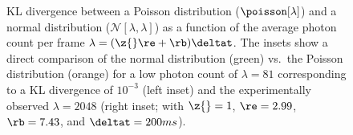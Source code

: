 \begin{figure}[t]
  \begin{panel}{}{\textwidth}
    \small
    \centerline{}
  \end{panel}
  \caption{%
    KL divergence between a Poisson distribution ($\poisson[\lambda]$) and a
    normal distribution ($\mathcal{N}[\lambda,\lambda]$) as a function of the
    average photon count per frame $\lambda = (\z{}\re + \rb)\deltat$. The
    insets show a direct comparison of the normal distribution (green) vs.\ the
    Poisson distribution (orange) for a low photon count of $\lambda=81$
    corresponding to a KL divergence of $10^{-3}$ (left inset) and the
    experimentally observed $\lambda=2048$ (right inset; with $\z{}=1$,
    $\re=2.99$, $\rb=7.43$, and $\deltat=200ms$).
  }
  \label{fig:poisson_vs_normal}
\end{figure}
